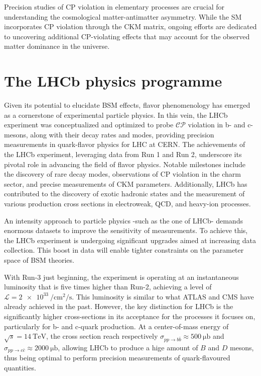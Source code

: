 Precision studies of CP violation in elementary processes are crucial for understanding the cosmological matter-antimatter asymmetry. While the SM incorporates CP violation through the CKM matrix, ongoing efforts are dedicated to uncovering additional CP-violating effects that may account for the observed matter dominance in the universe.

\section{The LHCb physics programme}
Given its potential to elucidate BSM effects, flavor phenomenology has emerged as a cornerstone of experimental particle physics. In this vein, the LHCb experiment was conceptualized and optimized to probe $\mathcal{CP}$ violation in b- and c-mesons, along with their decay rates and modes, providing precision measurements in quark-flavor physics for LHC at CERN.
The achievements of the LHCb experiment, leveraging data from Run 1 and Run 2, underscore its pivotal role in advancing the field of flavor physics. Notable milestones include the discovery of rare decay modes, observations of CP violation in the charm sector, and precise measurements of CKM parameters. Additionally, LHCb has contributed to the discovery of exotic hadronic states and the measurement of various production cross sections in electroweak, QCD, and heavy-ion processes.


An intensity approach to particle physics -such as the one of LHCb- demands enormous datasets to improve the sensitivity of measurements. To achieve this, the LHCb experiment is undergoing significant upgrades aimed at increasing data collection. This boost in data will enable tighter constraints on the parameter space of BSM theories. 


With Run-3 just beginning, the experiment is operating at an instantaneous luminosity that is five times higher than Run-2, achieving a level of $\mathcal{L}=\SI{2e33}{\per\centi\meter\squared\per\second}$. This luminosity is similar to what ATLAS and CMS have already achieved in the past. However, the key distinction for LHCb is the significantly higher cross-sections in its acceptance for the processes it focuses on, particularly for b- and c-quark production. At a center-of-mass energy of $\sqrt{s}=\SI{14}{\tera\eV}$, the cross section reach respectively $\sigma_{pp\rightarrow b\bar{b}}\approx\SI{500}{\micro\barn}$ and $\sigma_{pp\rightarrow c\bar{c}}\approx\SI{2000}{\micro\barn}$, allowing LHCb to produce a hige amount of $B$ and $D$ mesons, thus being optimal to perform precision measurements of quark-flavoured quantities.


